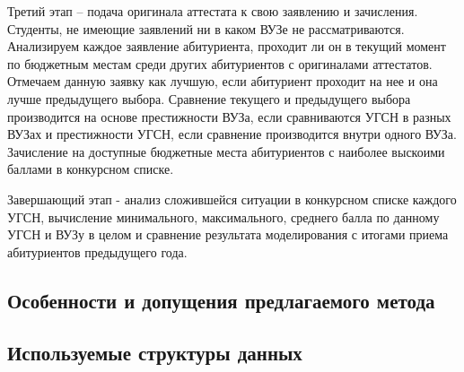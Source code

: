 Третий этап – подача оригинала аттестата к свою заявлению и зачисления. Студенты, не имеющие заявлений ни в каком ВУЗе не рассматриваются. Анализируем каждое заявление абитуриента, проходит ли он в текущий момент по бюджетным местам среди других абитуриентов с оригиналами аттестатов. Отмечаем данную заявку как лучшую, если абитуриент проходит на нее и она лучше предыдущего выбора. Сравнение текущего и предыдущего выбора производится на основе престижности ВУЗа, если сравниваются УГСН в разных ВУЗах и престижности УГСН, если сравнение производится внутри одного ВУЗа. Зачисление на доступные бюджетные места абитуриентов с наиболее выскоими баллами в конкурсном списке.

Завершающий этап - анализ сложившейся ситуации в конкурсном списке каждого УГСН, вычисление минимального, максимального, среднего балла по данному УГСН и ВУЗу в целом и сравнение результата моделирования с итогами приема абитуриентов предыдущего года.

\subsection{Особенности и допущения предлагаемого метода}

\subsection{Используемые структуры данных}





















\pagebreak